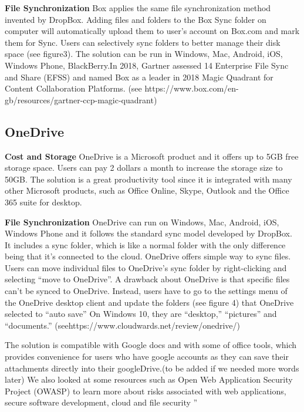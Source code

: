 \documentclass{article}
\begin{document}
\hfill \break
\textbf{File Synchronization}
Box applies the same file synchronization method invented by DropBox. Adding files and folders to the Box Sync folder on computer will automatically upload them to user’s account on Box.com and mark them for Sync. Users can selectively sync folders to better manage their disk space (see figure3). The solution can be run in Windows, Mac, Android, iOS, Windows Phone, BlackBerry.In 2018, Gartner assessed 14 Enterprise File Sync and Share (EFSS) and named Box as a leader in
2018 Magic Quadrant for Content Collaboration Platforms. (see  https://www.box.com/en-gb/resources/gartner-ccp-magic-quadrant)


\hfill \break
\subsection{OneDrive}
\textbf{Cost and Storage}
OneDrive is a Microsoft product and it offers up to 5GB free storage space. Users can pay 2 dollars a month to increase the storage size to 50GB. The solution is a great productivity tool since it is integrated with many other Microsoft products, such as Office Online, Skype, Outlook and the Office 365 suite for desktop.


\hfill \break
\textbf{File Synchronization}
OneDrive can run on Windows, Mac, Android, iOS, Windows Phone and it follows the standard sync model developed by DropBox. It includes a sync folder, which is like a normal folder with the only difference being that it’s connected to the cloud. OneDrive offers simple way to sync files. Users can move individual files to OneDrive’s sync folder by right-clicking and selecting “move to OneDrive”. A drawback about OneDrive is that specific files can’t be synced to OneDrive. Instead, users have to go to the settings menu of the OneDrive desktop client and update the folders (see figure 4) that OneDrive selected to “auto save” On Windows 10, they are “desktop,” “pictures” and “documents.” (seehttps://www.cloudwards.net/review/onedrive/)



The solution is compatible with Google docs and with some of office tools, which provides convenience for users who have google accounts as they can save their attachments directly into their googleDrive.(to be added if we needed more words later)
\newline
\hfill \break
We also looked at some resources such as Open Web Application Security Project (OWASP) to learn more about risks associated with web applications, secure software development, cloud and file security ''
\end{document}
